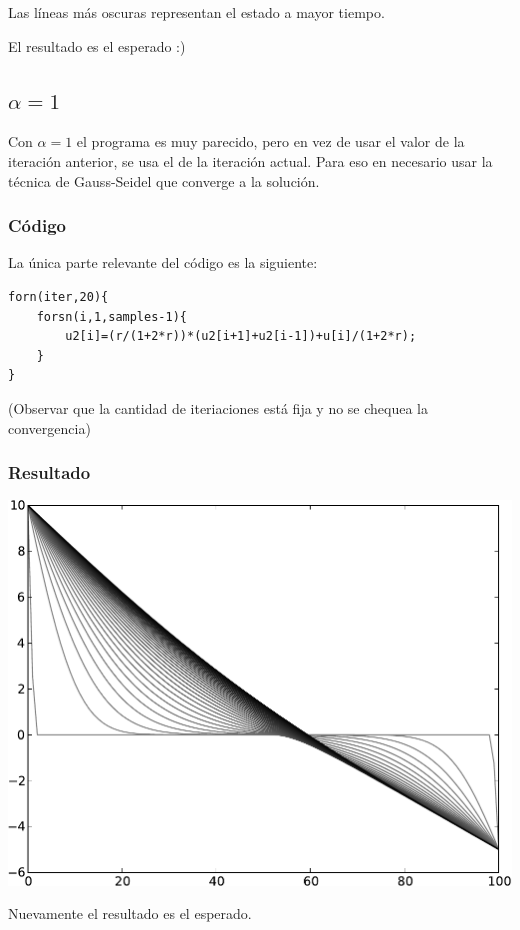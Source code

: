 \documentclass[12pt, a4paper]{article}
\begin{document}
				Las líneas más oscuras representan el estado a mayor tiempo.
				
				El resultado es el esperado :)
		
		\subsection{$\alpha=1$}
			Con $\alpha=1$ el programa es muy parecido, pero en vez de usar el valor de la iteración anterior, se usa el de la iteración actual.
			Para eso en necesario usar la técnica de Gauss-Seidel que converge a la solución.
			
			\subsubsection{Código}
				La única parte relevante del código es la siguiente:
\begin{lstlisting}
forn(iter,20){
	forsn(i,1,samples-1){
		u2[i]=(r/(1+2*r))*(u2[i+1]+u2[i-1])+u[i]/(1+2*r);
	}
}
\end{lstlisting}
				
				(Observar que la cantidad de iteriaciones está fija y no se chequea la convergencia)
			
			\subsubsection{Resultado}
				\begin{center}\includegraphics[width=.9\textwidth]{alpha0.pdf}\end{center}
				Nuevamente el resultado es el esperado.
		
\end{document}
